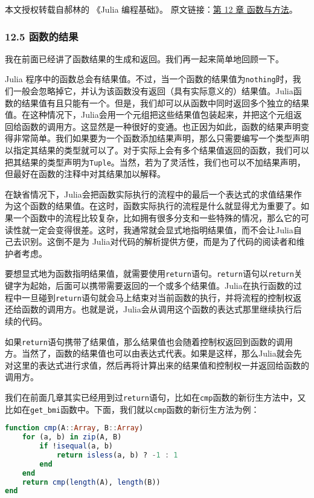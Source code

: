 
本文授权转载自郝林的 《Julia 编程基础》。 原文链接：\href{https://github.com/hyper0x/JuliaBasics/blob/master/book/ch12.md}{第 12 章 函数与方法}。


\subsubsection{12.5 函数的结果}

我在前面已经讲了函数结果的生成和返回。我们再一起来简单地回顾一下。

Julia 程序中的函数总会有结果值。不过，当一个函数的结果值为\verb`nothing`时，我们一般会忽略掉它，并认为该函数没有返回（具有实际意义的）结果值。Julia函数的结果值有且只能有一个。但是，我们却可以从函数中同时返回多个独立的结果值。在这种情况下，Julia会用一个元组把这些结果值包装起来，并把这个元组返回给函数的调用方。这显然是一种很好的变通。也正因为如此，函数的结果声明变得非常简单。我们如果要为一个函数添加结果声明，那么只需要编写一个类型声明以指定其结果的类型就可以了。对于实际上会有多个结果值返回的函数，我们可以把其结果的类型声明为\verb`Tuple`。当然，若为了灵活性，我们也可以不加结果声明，但最好在函数的注释中对其结果加以解释。

在缺省情况下，Julia会把函数实际执行的流程中的最后一个表达式的求值结果作为这个函数的结果值。在这时，函数实际执行的流程是什么就显得尤为重要了。如果一个函数中的流程比较复杂，比如拥有很多分支和一些特殊的情况，那么它的可读性就一定会变得很差。这时，我通常就会显式地指明结果值，而不会让Julia自己去识别。这倒不是为 Julia对代码的解析提供方便，而是为了代码的阅读者和维护者考虑。

要想显式地为函数指明结果值，就需要使用\verb`return`语句。\verb`return`语句以\verb`return`关键字为起始，后面可以携带需要返回的一个或多个结果值。Julia在执行函数的过程中一旦碰到\verb`return`语句就会马上结束对当前函数的执行，并将流程的控制权返还给函数的调用方。也就是说，Julia会从调用这个函数的表达式那里继续执行后续的代码。

如果\verb`return`语句携带了结果值，那么结果值也会随着控制权返回到函数的调用方。当然了，函数的结果值也可以由表达式代表。如果是这样，那么Julia就会先对这里的表达式进行求值，然后再将计算出来的结果值和控制权一并返回给函数的调用方。

我们在前面几章其实已经用到过\verb`return`语句，比如在\verb`cmp`函数的新衍生方法中，又比如在\verb`get_bmi`函数中。下面，我们就以\verb`cmp`函数的新衍生方法为例：

\begin{lstlisting}[language=julia]
function cmp(A::Array, B::Array)
    for (a, b) in zip(A, B)
        if !isequal(a, b)
            return isless(a, b) ? -1 : 1
        end
    end
    return cmp(length(A), length(B))
end
\end{lstlisting}

